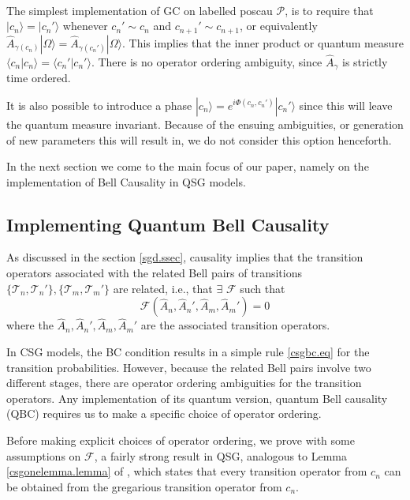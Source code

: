\documentclass[11pt]{article}
\newcommand{\ket}[1]{| #1 \rangle}
\newcommand{\braket}[2]{\langle #1| #2\rangle}
\newcommand{\cP}{\mathcal P}
\newcommand{\cT}{\mathcal T}
\newcommand{\hhT}{\hat A}
\newcommand{\cF}{\mathcal F}
\begin{document}
\\

The simplest implementation of GC on labelled poscau $\cP$, is to
require that $\ket{c_n}=\ket{c_n'}$ whenever $c_n' \sim c_n$ and
$c_{n+1}' \sim c_{n+1}$, or equivalently
$\hhT_{\gamma(c_n)} \ket{\Omega} =\hhT_{\gamma(c_n')} \ket{\Omega}
$. This implies that the inner product or quantum measure
$\braket{c_n}{c_n}=\braket{c_n'}{c_n'}$.   There is no operator
ordering ambiguity,  since $\hhT_{\gamma}$ is strictly time ordered.  
 

  It is also possible to introduce a phase $\ket{c_n}=e^{i
  \Phi(c_n,c_n')}\ket{c_n'}$ since this will leave the quantum
measure invariant.  Because of the ensuing ambiguities, or generation
of new parameters   this will
result in, we do not consider this option henceforth.  
  



In the next section we come to the main focus of our paper, namely on
the  implementation of Bell Causality in QSG models.

\subsection{Implementing Quantum Bell Causality} 
\label{qbc.ssec}

As discussed in the section \ref{sgd.ssec},  causality implies that
the transition operators associated with the related Bell 
pairs of transitions $\{\cT_n,\cT_n'\}, \{\cT_m,\cT_m' \}$ are 
related, i.e., that $\exists \, \, \mathcal{F}$ such that 
\begin{equation}
\cF(\hhT_n,\hhT_n',\hhT_m,\hhT_m')=0 \label{gBCGen.eq} 
\end{equation}
where the $\hhT_n,\hhT_n',
\hhT_m,\hhT_m'$ are the associated transition
operators. 

In CSG models, the BC condition results in a simple rule
\eqref{csgbc.eq} for the transition probabilities. However, 
because the related Bell pairs involve two different stages,
there are operator ordering ambiguities for the transition
operators. Any implementation of its quantum version, quantum Bell
causality (QBC)  requires us to make a specific
choice of operator ordering.  

Before making explicit choices of operator ordering, we prove 
with some assumptions on $\cF$, a fairly strong result in QSG,
analogous to   Lemma \ref{csgonelemma.lemma}  of  \cite{csgone}, which states that every transition
operator from $c_n$ can be obtained from the gregarious transition
operator from $c_n$.
\end{document}
